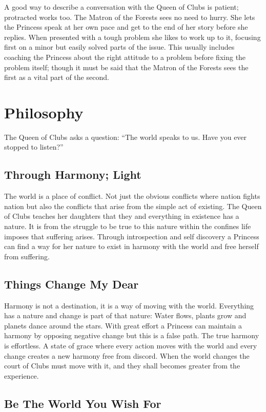 A good way to describe a conversation with the Queen of Clubs is patient; protracted works too. The Matron of the Forests sees no need to hurry. She lets the Princess speak at her own pace and get to the end of her story before she replies. When presented with a tough problem she likes to work up to it, focusing first on a minor but easily solved parts of the issue. This usually includes coaching the Princess about the right attitude to a problem before fixing the problem itself; though it must be said that the Matron of the Forests sees the first as a vital part of the second. 

\section*{Philosophy}
The Queen of Clubs asks a question: \textquotedblleft The world speaks to us. Have you ever stopped to listen?\textquotedblright

\subsection*{Through Harmony; Light}

The world is a place of conflict. Not just the obvious conflicts where nation fights nation but also the conflicts that arise from the simple act of existing. The Queen of Clubs teaches her daughters that they and everything in existence has a nature. It is from the struggle to be true to this nature within the confines life imposes that suffering arises. Through introspection and self discovery a Princess can find a way for her nature to exist in harmony with the world and free herself from suffering.

\subsection*{Things Change My Dear}

Harmony is not a destination, it is a way of moving with the world. Everything has a nature and change is part of that nature: Water flows, plants grow and planets dance around the stars. With great effort a Princess can maintain a harmony by opposing negative change but this is a false path. The true harmony is effortless. A state of grace where every action moves with the world and every change creates a new harmony free from discord. When the world changes the court of Clubs must move with it, and they shall becomes greater from the experience.

\subsection*{Be The World You Wish For}

